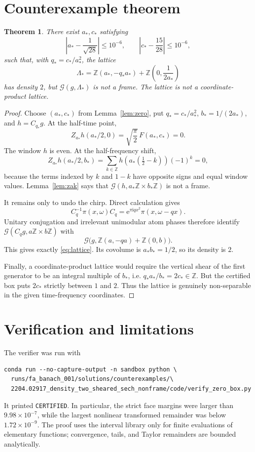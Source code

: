 \documentclass[11pt]{article}
\newtheorem{theorem}{Theorem}
\newcommand{\Z}{\mathbb Z}
\newcommand{\e}{\mathrm e}
\newcommand{\ii}{\mathrm i}
\newcommand{\cG}{\mathcal G}
\begin{document}
\section{Counterexample theorem}

\begin{theorem}\label{thm:main}
There exist \(a_*,c_*\) satisfying
\[
 \left|a_*-\frac1{\sqrt{28}}\right|\le10^{-6},\qquad
 \left|c_*-\frac{15}{28}\right|\le10^{-6},
\]
such that, with \(q_*=c_*/a_*^2\), the lattice
\begin{equation}\label{eq:lattice}
 \Lambda_*=\Z(a_*,-q_*a_*)+
 \Z\left(0,\frac1{2a_*}\right)
\end{equation}
has density \(2\), but \(\cG(g,\Lambda_*)\) is not a frame.
The lattice is not a coordinate-product lattice.
\end{theorem}

\begin{proof}
Choose \((a_*,c_*)\) from Lemma~\ref{lem:zero}, put
\(q_*=c_*/a_*^2\), \(b_*=1/(2a_*)\), and \(h=C_{q_*}g\).
At the half-time point,
\[
 Z_{a_*}h(a_*/2,0)=\sqrt{\frac\pi2}\,F(a_*,c_*)=0.
\]
The window \(h\) is even.  At the half-frequency shift,
\[
 Z_{a_*}h(a_*/2,b_*)
 =\sum_{k\in\Z}h(a_*(\tfrac12-k))(-1)^k=0,
\]
because the terms indexed by \(k\) and \(1-k\) have opposite signs and
equal window values.  Lemma~\ref{lem:zak} says that
\(\cG(h,a_*\Z\times b_*\Z)\) is not a frame.

It remains only to undo the chirp.  Direct calculation gives
\[
 C_q^{-1}\pi(x,\omega)C_q
 =\e^{\pi\ii qx^2}\pi(x,\omega-qx).
\]
Unitary conjugation and irrelevant unimodular atom phases therefore identify
\(\cG(C_qg,a\Z\times b\Z)\) with
\[
 \cG\bigl(g,\Z(a,-qa)+\Z(0,b)\bigr).
\]
This gives exactly \eqref{eq:lattice}.  Its covolume is
\(a_*b_*=1/2\), so its density is \(2\).

Finally, a coordinate-product lattice would require the vertical shear of
the first generator to be an integral multiple of \(b_*\), i.e.
\(q_*a_*/b_*=2c_*\in\Z\).  But the certified box puts
\(2c_*\) strictly between \(1\) and \(2\).  Thus the lattice is genuinely
non-separable in the given time-frequency coordinates.
\end{proof}

\section{Verification and limitations}

The verifier was run with
\begin{verbatim}
conda run --no-capture-output -n sandbox python \
  runs/fa_banach_001/solutions/counterexamples/\
  2204.02917_density_two_sheared_sech_nonframe/code/verify_zero_box.py
\end{verbatim}
It printed \texttt{CERTIFIED}.  In particular, the strict face margins were
larger than \(9.98\times10^{-7}\), while the largest nonlinear transformed
remainder was below \(1.72\times10^{-9}\).  The proof uses the interval
library only for finite evaluations of elementary functions; convergence,
tails, and Taylor remainders are bounded analytically.
\end{document}
